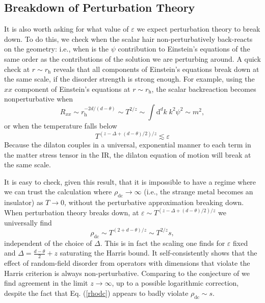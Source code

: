 \documentclass[10pt, oneside]{book}
\begin{document}
\begin{doublespace}
\subsection{Breakdown of Perturbation Theory}

It is also worth asking for what value of $\varepsilon$ we expect perturbation theory to break down.   To do this, we check when the scalar hair non-perturbatively back-reacts on the geometry: i.e., when is the $\psi$ contribution to Einstein's equations of the same order as the contributions of the solution we are perturbing around.   A quick check at $r\sim r_{\mathrm{h}}$ reveals that all components of Einstein's equations break down at the same scale, if the disorder strength is strong enough.   For example, using the $xx$ component of Einstein's equations at $r\sim r_{\mathrm{h}}$, the scalar backreaction becomes nonperturbative when\begin{equation}
R_{xx} \sim r_{\mathrm{h}}^{-2d/(d-\theta)} \sim T^{2/z} \sim \int \mathrm{d}^dk\; k^2 \psi^2 \sim m^2,
\end{equation}or when the temperature falls below %
\begin{equation}
T^{(z-\Delta+(d-\theta)/2)/z} \lesssim \varepsilon   \label{eq49}
\end{equation}
Because the dilaton couples in a universal, exponential manner to each term in the matter stress tensor in the IR, the dilaton equation of motion will break at the same scale.

It is easy to check, given this result, that it is impossible to have a regime where we can trust the calculation where $\rho_{\mathrm{dc}} \rightarrow \infty$ (i.e., the strange metal becomes an insulator) as $T\rightarrow 0$, without the perturbative approximation breaking down. When perturbation theory breaks down, at $\varepsilon \sim T^{(z-\Delta+(d-\theta)/2)/z}$  we universally find 
\begin{equation}
\rho_{\mathrm{dc}} \sim T^{(2+d-\theta)/z} \sim T^{2/z}s,   
\label{rhodc2}
\end{equation} 
independent of the choice of $\Delta$.
This is in fact the scaling one finds for $\varepsilon$ fixed and $\Delta= \frac{d-\theta}{2}+z$ saturating the Harris bound. It self-consistently shows that the effect of random-field disorder from operators with dimensions that violate the Harris criterion is always non-perturbative.
Comparing to the conjecture of \cite{Davison:2013txa} we find agreement in the limit $z\rightarrow \infty$, up to a possible logarithmic correction, despite the fact that Eq. (\ref{rhodc}) appears to badly violate $\rho_{\mathrm{dc}}\sim s$.



\end{doublespace}
\end{document}
